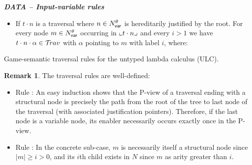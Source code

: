 \documentclass{article}
\theoremstyle{definition}
\newtheorem{remark}{Remark}[section]
\newcommand\Nodes{N}%
\newcommand\NodesVar{N_{\sf var}}%
\newcommand{\ghostlmd}{{\lambda\!\!\lambda}}
\newcommand{\ghostvar}{\theta}
\begin{document}
\begin{FramedTable}
\emph{\bf DATA -- Input-variable rules}
\begin{itemize}
\item {} If $t \cdot n$ is a traversal where $n \in \NodesVar^\ghostvar$ is hereditarily justified by the root. For every node $m \in \NodesVar^\ghostvar$ occurring in $\llcorner t\cdot n \lrcorner$
and every $i>1$ we have $t \cdot n \cdot \alpha \in \mathcal{T}\!rav$ with $\alpha$ pointing to $m$ with label $i$, where:
\end{itemize}


\caption{Game-semantic traversal rules for the untyped lambda calculus (ULC).}
 \label{tab:trav_rules}
\end{FramedTable}

\begin{remark}
The traversal rules are well-defined:
\begin{itemize}
\item Rule : An easy induction shows that the P-view of a traversal ending with a structural node is precisely the path from the root of the tree to last node of the traversal (with associated justification pointers).
Therefore, if the last node is a variable node, its enabler necessarily occurs exactly once in the P-view.
\item Rule : In the concrete sub-case, $m$ is necessarily itself a structural node since $|m|\geq i>0$, and its $i$th child exists in $\Nodes$ since $m$ as arity greater than $i$.
\end{itemize}
\end{remark}
\end{document}
